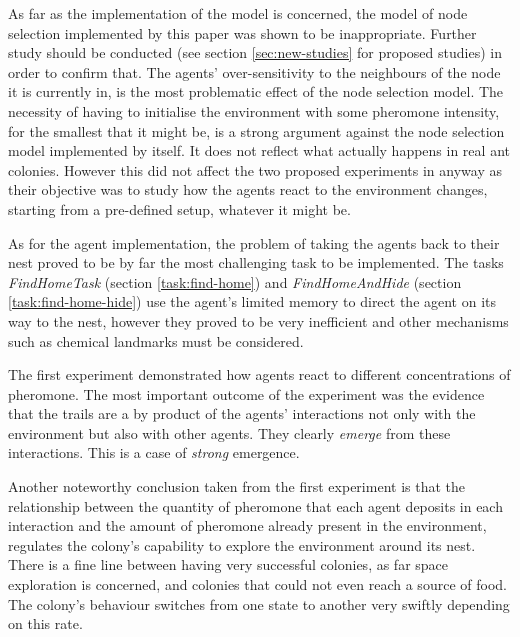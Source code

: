 As far as the implementation of the model is concerned, the model of node selection implemented by this paper was shown to be inappropriate. Further study should be conducted (see section \ref{sec:new-studies} for proposed studies) in order to confirm that. The agents' over-sensitivity to the neighbours of the node it is currently in, is the most problematic effect of the node selection model. The necessity of having to initialise the environment with some pheromone intensity, for the smallest that it might be, is a strong argument against the node selection model implemented by itself. It does not reflect what actually happens in real ant colonies. However this did not affect the two proposed experiments in anyway as their objective was to study how the agents react to the environment changes, starting from a pre-defined setup, whatever it might be.

As for the agent implementation, the problem of taking the agents back to their nest proved to be by far the most challenging task to be implemented. The tasks \emph{FindHomeTask} (section \ref{task:find-home}) and \emph{FindHomeAndHide} (section \ref{task:find-home-hide}) use the agent's limited memory to direct the  agent on its way to the nest, however they proved to be very inefficient and other mechanisms such as chemical landmarks must be considered.

The first experiment demonstrated how agents react to different concentrations of pheromone. The most important outcome of the experiment was the evidence that the trails are a by product of the agents' interactions not only with the environment but also with other agents. They clearly \emph{emerge} from these interactions. This is a case of \emph{strong} emergence. 

Another noteworthy conclusion taken from the first experiment is that the relationship between the quantity of pheromone that each agent deposits in each interaction and the amount of pheromone already present in the environment, regulates the colony's capability to explore the environment around its nest. There is a fine line between having very successful colonies, as far space exploration is concerned, and colonies that could not even reach a source of food. The colony's behaviour switches from one state to another very swiftly depending on this rate.

